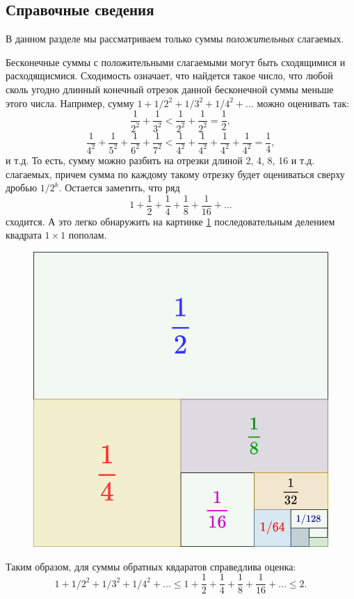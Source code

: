 
\subsection*{Справочные сведения}

В данном разделе мы рассматриваем только суммы \textit{положительных} слагаемых.

Бесконечные суммы с положительными слагаемыми могут быть сходящимися и расходящисмися. Сходимость означает, что найдется такое число, что любой сколь угодно длинный конечный отрезок данной бесконечной суммы меньше этого числа. Например, сумму
$1+1/2^2+1/3^2+1/4^2+\dots$ можно оценивать так:
$$
\frac{1}{2^2}+\frac{1}{3^2}<\frac{1}{2^2}+\frac{1}{2^2}=\frac12,
$$
$$
\frac{1}{4^2}+\frac{1}{5^2}+\frac{1}{6^2}+\frac{1}{7^2}<\frac{1}{4^2}+\frac{1}{4^2}+\frac{1}{4^2}+\frac{1}{4^2}=\frac14,
$$
и т.д. То есть, сумму можно разбить на отрезки длиной 2, 4, 8, 16 и т.д. слагаемых, причем сумма по каждому такому отрезку будет оцениваться сверху дробью $1/2^k$. Остается заметить, что ряд
$$
1+\frac{1}{2}+\frac{1}{4}+\frac{1}{8}+\frac{1}{16}+\dots
$$
сходится. А это легко обнаружить на картинке \ref{geomseq} последовательным делением квадрата $1\times 1$ пополам.
\begin{figure}[hbt]
\begin{center}
\includegraphics[scale=0.3]{../geomseq.png}
\end{center}
\caption{}\label{geomseq}
\end{figure}
Таким образом, для суммы обратных квдаратов справедлива оценка:
$$
1+1/2^2+1/3^2+1/4^2+\dots \le 1+\frac{1}{2}+\frac{1}{4}+\frac{1}{8}+\frac{1}{16}+\dots \le 2.
$$


